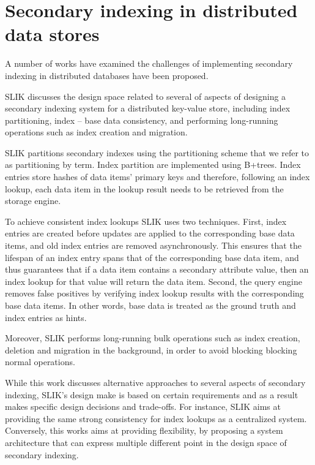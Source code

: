 \section{Secondary indexing in distributed data stores}
\label{sec:secondaryindexing}
A number of works \cite{kejriwal:slik, dsilva:tworings, tan:diffindex, tang:deferredindexing}
have examined the challenges of implementing secondary indexing in distributed databases have been proposed.

SLIK \cite{kejriwal:slik} discusses the design space related to several of aspects of designing a secondary indexing system
for a distributed key-value store, including index partitioning, index -- base data consistency,
and performing long-running operations such as index creation and migration.

SLIK partitions secondary indexes using the partitioning scheme that we refer to as partitioning by term.
Index partition are implemented using B+trees.
Index entries store hashes of data items' primary keys and therefore,
following an index lookup, each data item in the lookup result needs to be retrieved from the storage engine.

To achieve consistent index lookups SLIK uses two techniques.
First, index entries are created before updates are applied to the corresponding base data items,
and old index entries are removed asynchronously.
This ensures that the lifespan of an index entry spans that of the corresponding base data item,
and thus guarantees that if a data item contains a secondary attribute value, then an index lookup for that value will
return the data item.
Second, the query engine removes false positives by verifying index lookup results with the corresponding base data items.
In other words, base data is treated as the ground truth and index entries as hints.

Moreover, SLIK performs long-running bulk operations such as index creation, deletion and migration in the background,
in order to avoid blocking blocking normal operations.

While this work discusses alternative approaches to several aspects of secondary indexing,
SLIK's design make is based on certain requirements and as a result makes specific design decisions and trade-offs.
For instance, SLIK aims at providing the same strong consistency for index lookups as a centralized system.
Conversely, this works aims at providing flexibility, by proposing a system architecture that can express multiple
different point in the design space of secondary indexing.

